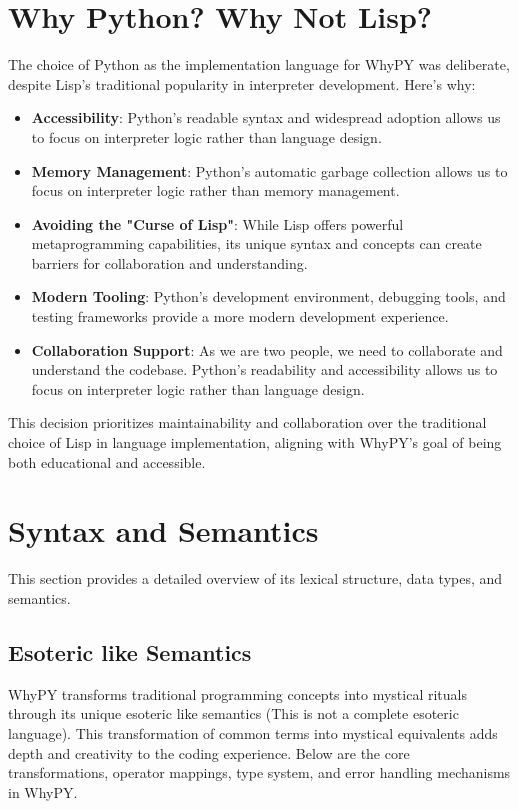 \documentclass[11pt]{article}
\begin{document}
\section{Why Python? Why Not Lisp?}
The choice of Python as the implementation language for WhyPY was deliberate, despite Lisp's traditional popularity in interpreter development. Here's why:

\begin{itemize}
    \item \textbf{Accessibility}: Python's readable syntax and widespread adoption allows us to focus on interpreter logic rather than language design.
    
    \item \textbf{Memory Management}: Python's automatic garbage collection allows us to focus on interpreter logic rather than memory management.
    
    \item \textbf{Avoiding the "Curse of Lisp"}: While Lisp offers powerful metaprogramming capabilities, its unique syntax and concepts can create barriers for collaboration and understanding.
    
    \item \textbf{Modern Tooling}: Python's development environment, debugging tools, and testing frameworks provide a more modern development experience.
    
    \item \textbf{Collaboration Support}: As we are two people, we need to collaborate and understand the codebase. Python's readability and accessibility allows us to focus on interpreter logic rather than language design.
\end{itemize}

This decision prioritizes maintainability and collaboration over the traditional choice of Lisp in language implementation, aligning with WhyPY's goal of being both educational and accessible.

\section{Syntax and Semantics}
This section provides a detailed overview of its lexical structure, data types, and semantics.

\subsection{Esoteric like Semantics}
WhyPY transforms traditional programming concepts into mystical rituals through its unique esoteric like semantics (This is not a complete esoteric language). This transformation of common terms into mystical equivalents adds depth and creativity to the coding experience. Below are the core transformations, operator mappings, type system, and error handling mechanisms in WhyPY.
\end{document}
